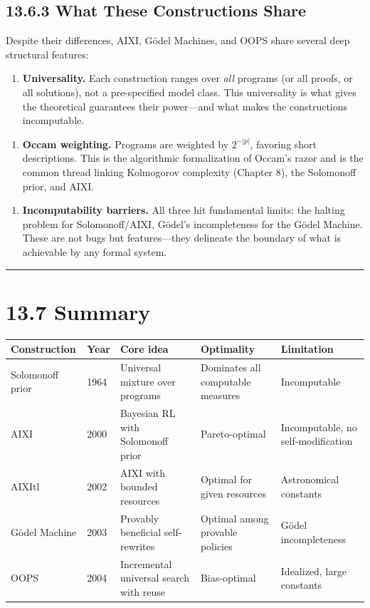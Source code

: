 \subsection{13.6.3 What These Constructions Share}

Despite their differences, AIXI, Gödel Machines, and OOPS share several deep structural features:

\begin{enumerate}
  \item \textbf{Universality.} Each construction ranges over \textit{all} programs (or all proofs, or all solutions), not a pre-specified model class. This universality is what gives the theoretical guarantees their power---and what makes the constructions incomputable.
\end{enumerate}

\begin{enumerate}
  \item \textbf{Occam weighting.} Programs are weighted by $2^{-|p|}$, favoring short descriptions. This is the algorithmic formalization of Occam's razor and is the common thread linking Kolmogorov complexity (Chapter 8), the Solomonoff prior, and AIXI.
\end{enumerate}

\begin{enumerate}
  \item \textbf{Incomputability barriers.} All three hit fundamental limits: the halting problem for Solomonoff/AIXI, Gödel's incompleteness for the Gödel Machine. These are not bugs but features---they delineate the boundary of what is achievable by any formal system.
\end{enumerate}

\bigskip\hrule\bigskip

\section{13.7 Summary}

\begin{tabular}{|l|l|l|l|l|}
\hline
Construction & Year & Core idea & Optimality & Limitation \\
\hline
Solomonoff prior & 1964 & Universal mixture over programs & Dominates all computable measures & Incomputable \\
AIXI & 2000 & Bayesian RL with Solomonoff prior & Pareto-optimal & Incomputable, no self-modification \\
AIXItl & 2002 & AIXI with bounded resources & Optimal for given resources & Astronomical constants \\
Gödel Machine & 2003 & Provably beneficial self-rewrites & Optimal among provable policies & Gödel incompleteness \\
OOPS & 2004 & Incremental universal search with reuse & Bias-optimal & Idealized, large constants \\
\hline
\end{tabular}


